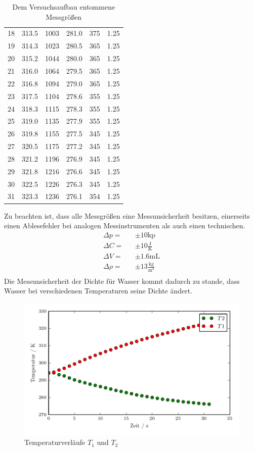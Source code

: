\begin{table}
\begin{tabular}{c c c c c c}
    18	& 313.5	& 1003	& 281.0	& 375	& 1.25	\\
    19	& 314.3	& 1023	& 280.5	& 365	& 1.25	\\
    20	& 315.2	& 1044	& 280.0	& 365	& 1.25	\\
    21	& 316.0	& 1064	& 279.5	& 365	& 1.25	\\
    22	& 316.8	& 1094	& 279.0	& 365	& 1.25	\\
    23	& 317.5	& 1104	& 278.6	& 355	& 1.25	\\
    24	& 318.3	& 1115	& 278.3	& 355	& 1.25	\\
    25	& 319.0	& 1135	& 277.9	& 355	& 1.25	\\
    26	& 319.8	& 1155	& 277.5	& 345	& 1.25	\\
    27	& 320.5	& 1175	& 277.2	& 345	& 1.25	\\
    28	& 321.2	& 1196	& 276.9	& 345	& 1.25	\\
    29	& 321.8	& 1216	& 276.6	& 345	& 1.25	\\
    30	& 322.5	& 1226	& 276.3	& 345	& 1.25	\\
    31	& 323.3	& 1236	& 276.1	& 354	& 1.25	\\
  \end{tabular}
  \caption{Dem Versuchsaufbau entommene Messgrößen}
  \label{tab:Daten}
\end{table}

Zu beachten ist, dass alle Messgrößen eine Messunsicherheit besitzen, einerseits einen Ablesefehler bei analogen Messinstrumenten als auch einen technischen.
\begin{eqnarray*}
  \Delta p =& &\pm 10 \text{kp}				\\
  \Delta C =& &\pm 10 \frac{\text{J}}{\text{K}}		\\
  \Delta V =& &\pm 1.6 \text{mL}				\\
  \Delta \rho =& &\pm 13 \frac{\text{kg}}{\text{m$^3$}}	\\
\end{eqnarray*}
Die Messunsicherheit der Dichte für Wasser kommt dadurch zu stande, dass Wasser bei verschiedenen Temperaturen seine Dichte ändert.
\begin{figure}
  \centering
  \includegraphics[width=\textwidth]{TVerlauf.pdf}
  \caption{Temperaturverläufe $T_\text{1}$ und $T_\text{2}$}
  \label{fig:T1&T2}
\end{figure}
